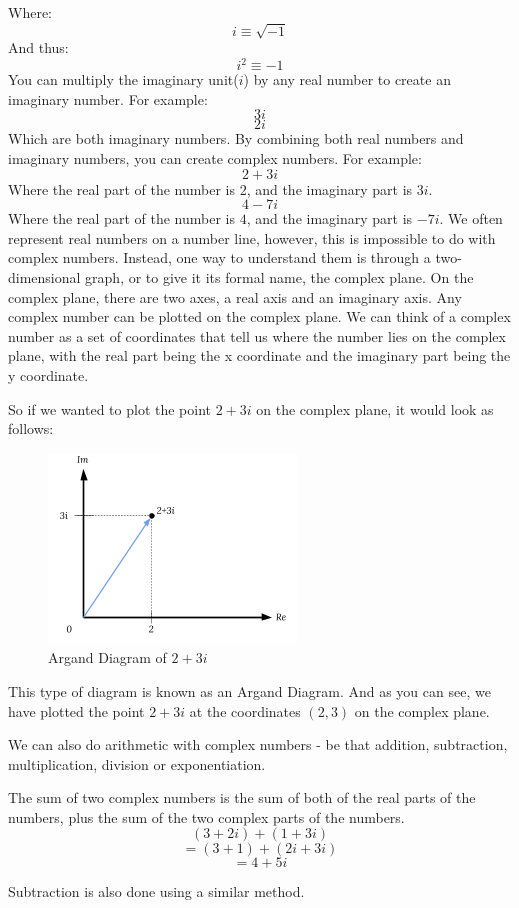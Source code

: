 \documentclass{article}
\begin{document}
Where: $$i \equiv \sqrt{-1}$$
And thus: $$i^2 \equiv -1$$
You can multiply the imaginary unit($i$) by any real number to create an imaginary number. For example:
$$3i$$
$$2i$$
Which are both imaginary numbers.
By combining both real numbers and imaginary numbers, you can create complex numbers.
For example:
$$2+3i$$
Where the real part of the number is $2$, and the imaginary part is $3i$.
$$4-7i$$
Where the real part of the number is $4$, and the imaginary part is $-7i$.
We often represent real numbers on a number line, however, this is impossible to do with complex numbers. Instead, one way to understand them is through a two-dimensional graph, or to give it its formal name, the complex plane. On the complex plane, there are two axes, a real axis and an imaginary axis. Any complex number can be plotted on the complex plane. We can think of a complex number as a set of coordinates that tell us where the number lies on the complex plane, with the real part being the x coordinate and the imaginary part being the y coordinate.

So if we wanted to plot the point $2+3i$ on the complex plane, it would look as follows:

\clearpage
\begin{figure}[ht]
    \centering
    \includegraphics[scale=1]{argand diagram 23i}
    \caption{Argand Diagram of $2+3i$}
\end{figure}

This type of diagram is known as an Argand Diagram. And as you can see, we have plotted the point $2+3i$ at the coordinates $(2, 3)$ on the complex plane.

We can also do arithmetic with complex numbers - be that addition, subtraction, multiplication, division or exponentiation.

The sum of two complex numbers is the sum of both of the real parts of the numbers, plus the sum of the two complex parts of the numbers.
$$(3+2i) + (1+3i)$$
$$= (3+1) + (2i+3i)$$
$$= 4 + 5i$$

Subtraction is also done using a similar method.
\end{document}
